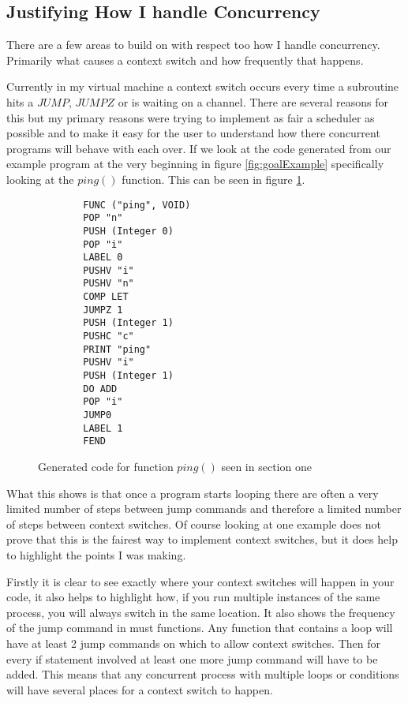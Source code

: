 \subsection{Justifying How I handle Concurrency}

There are a few areas to build on with respect too how I handle concurrency. Primarily what causes a context switch and how frequently that happens. 

Currently in my virtual machine a context switch occurs every time a subroutine hits a $JUMP$, $JUMPZ$ or is waiting on a channel. There are several reasons for this but my primary reasons were trying to implement as fair a scheduler as possible and to make it easy for the user to understand how there concurrent programs will behave with each over. If we look at the code generated from our example program at the very beginning in figure \ref{fig:goalExample} specifically looking at the $ping()$ function. This can be seen in figure \ref{fig:pingCode}.

\begin{figure}[h]
\centering
\begin{lstlisting}
		FUNC ("ping", VOID)
		POP "n"
		PUSH (Integer 0)
		POP "i"
		LABEL 0
		PUSHV "i"
		PUSHV "n"
		COMP LET
		JUMPZ 1
		PUSH (Integer 1)
		PUSHC "c"
		PRINT "ping"
		PUSHV "i"
		PUSH (Integer 1)
		DO ADD
		POP "i"
		JUMP0
		LABEL 1
		FEND
\end{lstlisting}
\caption{Generated code for function $ping()$ seen in section one}
\label{fig:pingCode}
\end{figure}


What this shows is that once a program starts looping there are often a very limited number of steps between jump commands and therefore a limited number of steps between context switches. Of course looking at one example does not prove that this is the fairest way to implement context switches, but it does help to highlight the points I was making.

Firstly it is clear to see exactly where your context switches will happen in your code, it also helps to highlight how, if you run multiple instances of the same process, you will always switch in the same location. It also shows the frequency of the jump command in must functions. Any function that contains a loop will have at least 2 jump commands on which to allow context switches. Then for every if statement involved at least one more jump command will have to be added. This means that any concurrent process with multiple loops or conditions will have several places for a context switch to happen.

